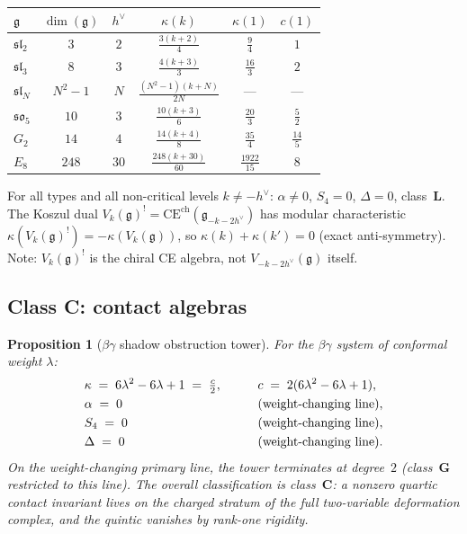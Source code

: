 \documentclass[11pt]{article}
\theoremstyle{plain}
\newtheorem{proposition}[theorem]{Proposition}
\theoremstyle{definition}
\theoremstyle{remark}
\newcommand{\fg}{\mathfrak{g}}
\begin{document}
\begin{center}
\renewcommand{\arraystretch}{1.2}
\begin{tabular}{lccccc}
\toprule
$\fg$ & $\dim(\fg)$ & $h^\vee$ &
 $\kappa(k)$ & $\kappa(1)$ & $c(1)$ \\
\midrule
$\mathfrak{sl}_2$ & $3$ & $2$ &
 $\frac{3(k+2)}{4}$ & $\frac{9}{4}$ & $1$ \\[2pt]
$\mathfrak{sl}_3$ & $8$ & $3$ &
 $\frac{4(k+3)}{3}$ & $\frac{16}{3}$ & $2$ \\[2pt]
$\mathfrak{sl}_N$ & $N^2{-}1$ & $N$ &
 $\frac{(N^2{-}1)(k+N)}{2N}$ & --- & --- \\[2pt]
$\mathfrak{so}_5$ & $10$ & $3$ &
 $\frac{10(k+3)}{6}$ & $\frac{20}{3}$ & $\frac{5}{2}$ \\[2pt]
$G_2$ & $14$ & $4$ &
 $\frac{14(k+4)}{8}$ & $\frac{35}{4}$ & $\frac{14}{5}$ \\[2pt]
$E_8$ & $248$ & $30$ &
 $\frac{248(k+30)}{60}$ & $\frac{1922}{15}$ & $8$ \\[2pt]
\bottomrule
\end{tabular}
\end{center}

\noindent For all types and all non-critical levels
$k \neq -h^\vee$: $\alpha \neq 0$, $S_4 = 0$,
$\Delta = 0$, class~$\mathbf{L}$.
The Koszul dual $V_k(\fg)^{!} = \mathrm{CE}^{\mathrm{ch}}(\fg_{-k-2h^\vee})$
has modular characteristic $\kappa(V_k(\fg)^!) = -\kappa(V_k(\fg))$,
so $\kappa(k) + \kappa(k') = 0$ (exact anti-symmetry). Note:
$V_k(\fg)^!$ is the chiral CE algebra, not $V_{-k-2h^\vee}(\fg)$ itself.


\subsection{Class C: contact algebras}
\label{subsec:class-C}

\begin{proposition}[$\beta\gamma$ shadow obstruction tower]
\label{prop:betagamma-shadow}
For the $\beta\gamma$ system of conformal weight $\lambda$:
\begin{alignat*}{2}
 &\kappa \;=\; 6\lambda^2 - 6\lambda + 1
 \;=\; \tfrac{c}{2},
 \qquad
 &&c \;=\; 2(6\lambda^2 - 6\lambda + 1), \\
 &\alpha \;=\; 0
 &&\textup{(weight-changing line)}, \\
 &S_4 \;=\; 0
 &&\textup{(weight-changing line)}, \\
 &\Delta \;=\; 0
 &&\textup{(weight-changing line)}.
\end{alignat*}
On the weight-changing primary line, the tower terminates
at degree~$2$ (class~$\mathbf{G}$ restricted to this line).
The overall classification is class~$\mathbf{C}$: a
nonzero quartic contact invariant lives on the charged
stratum of the full two-variable deformation complex,
and the quintic vanishes by rank-one rigidity.
\end{proposition}
\end{document}

